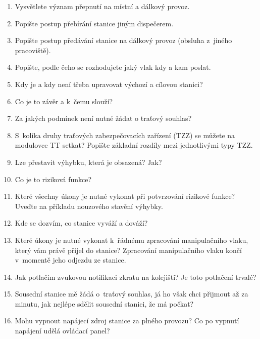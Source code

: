 \documentclass[12pt,a4paper]{article}
\begin{document}
\begin{enumerate}[leftmargin=*]
\item Vysvětlete význam přepnutí na místní a dálkový provoz.

\item Popište postup přebírání stanice jiným dispečerem.

\item Popište postup předávání stanice na dálkový provoz (obsluha z~jiného
pracoviště).

\item Popište, podle čeho se rozhodujete jaký vlak kdy a kam poslat.

\item Kdy je a kdy není třeba upravovat výchozí a cílovou stanici?

\item Co je to závěr a k~čemu slouží?

\item Za jakých podmínek není nutné žádat o traťový souhlas?

\item S~kolika druhy traťových zabezpečovacích zařízení (TZZ) se můžete na
modulovce TT setkat? Popište základní rozdíly mezi jednotlivými typy TZZ.

\item Lze přestavit výhybku, která je obsazená? Jak?

\item Co je to riziková funkce?

\item Které všechny úkony je nutné vykonat při potvrzování rizikové funkce?
Uveďte na příkladu nouzového stavění výhybky.

\item Kde se dozvím, co stanice vyváží a dováží?

\item Které úkony je nutné vykonat k~řádnému zpracování manipulačního vlaku,
který vám právě přijel do stanice? Zpracování manipulačního vlaku končí
v~momentě jeho odjezdu ze stanice.

\item Jak potlačím zvukovou notifikaci zkratu na kolejišti? Je toto potlačení
trvalé?

\item Sousední stanice mě žádá o~traťový souhlas, já ho však chci přijmout až
za minutu, jak nejlépe sdělit sousední stanici, že má počkat?

\item Mohu vypnout napájecí zdroj stanice za plného provozu? Co po vypnutí
napájení udělá ovládací panel?


\end{enumerate}
\end{document}
